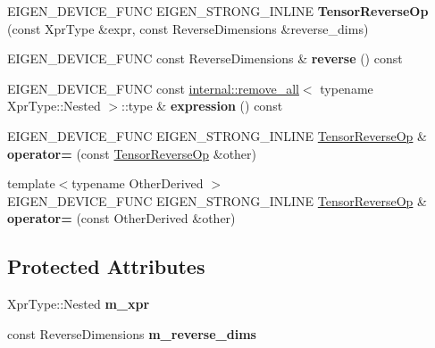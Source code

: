\begin{DoxyCompactItemize}
E\+I\+G\+E\+N\+\_\+\+D\+E\+V\+I\+C\+E\+\_\+\+F\+U\+NC E\+I\+G\+E\+N\+\_\+\+S\+T\+R\+O\+N\+G\+\_\+\+I\+N\+L\+I\+NE {\bfseries Tensor\+Reverse\+Op} (const Xpr\+Type \&expr, const Reverse\+Dimensions \&reverse\+\_\+dims)
\item 
\mbox{\label{class_eigen_1_1_tensor_reverse_op_ad756c4a835eca6c47a3a65b0e1fd6f81}} 
E\+I\+G\+E\+N\+\_\+\+D\+E\+V\+I\+C\+E\+\_\+\+F\+U\+NC const Reverse\+Dimensions \& {\bfseries reverse} () const
\item 
\mbox{\label{class_eigen_1_1_tensor_reverse_op_a400eddf4cfaafe3916e21e6cf1e50932}} 
E\+I\+G\+E\+N\+\_\+\+D\+E\+V\+I\+C\+E\+\_\+\+F\+U\+NC const \hyperlink{struct_eigen_1_1internal_1_1remove__all}{internal\+::remove\+\_\+all}$<$ typename Xpr\+Type\+::\+Nested $>$\+::type \& {\bfseries expression} () const
\item 
\mbox{\label{class_eigen_1_1_tensor_reverse_op_a364a93315bf7ededd0b9df82242cc75c}} 
E\+I\+G\+E\+N\+\_\+\+D\+E\+V\+I\+C\+E\+\_\+\+F\+U\+NC E\+I\+G\+E\+N\+\_\+\+S\+T\+R\+O\+N\+G\+\_\+\+I\+N\+L\+I\+NE \hyperlink{class_eigen_1_1_tensor_reverse_op}{Tensor\+Reverse\+Op} \& {\bfseries operator=} (const \hyperlink{class_eigen_1_1_tensor_reverse_op}{Tensor\+Reverse\+Op} \&other)
\item 
\mbox{\label{class_eigen_1_1_tensor_reverse_op_a3b404543d64d84a0974593bfa946a0e1}} 
{\footnotesize template$<$typename Other\+Derived $>$ }\\E\+I\+G\+E\+N\+\_\+\+D\+E\+V\+I\+C\+E\+\_\+\+F\+U\+NC E\+I\+G\+E\+N\+\_\+\+S\+T\+R\+O\+N\+G\+\_\+\+I\+N\+L\+I\+NE \hyperlink{class_eigen_1_1_tensor_reverse_op}{Tensor\+Reverse\+Op} \& {\bfseries operator=} (const Other\+Derived \&other)
\end{DoxyCompactItemize}
\subsection*{Protected Attributes}
\begin{DoxyCompactItemize}
\item 
\mbox{\label{class_eigen_1_1_tensor_reverse_op_aaf025543dec007468363a42036d76081}} 
Xpr\+Type\+::\+Nested {\bfseries m\+\_\+xpr}
\item 
\mbox{\label{class_eigen_1_1_tensor_reverse_op_a61c5eef063415d62d17b6d588c975cca}} 
const Reverse\+Dimensions {\bfseries m\+\_\+reverse\+\_\+dims}
\end{DoxyCompactItemize}
